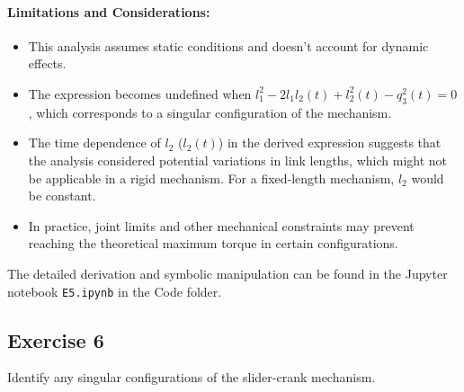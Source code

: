 \begin{solution}
\paragraph{Limitations and Considerations:}
\begin{itemize}
    \item This analysis assumes static conditions and doesn't account for dynamic effects.
    \item The expression becomes undefined when $l_1^2 - 2l_1l_2(t) + l_2^2(t) - q_3^2(t) = 0$, which corresponds to a singular configuration of the mechanism.
    \item The time dependence of $l_2$ ($l_2(t)$) in the derived expression suggests that the analysis considered potential variations in link lengths, which might not be applicable in a rigid mechanism. For a fixed-length mechanism, $l_2$ would be constant.
    \item In practice, joint limits and other mechanical constraints may prevent reaching the theoretical maximum torque in certain configurations.
\end{itemize}

The detailed derivation and symbolic manipulation can be found in the Jupyter notebook \texttt{E5.ipynb} in the Code folder.    \end{solution}
\subsection{Exercise 6}
Identify any singular configurations of the slider-crank mechanism.

